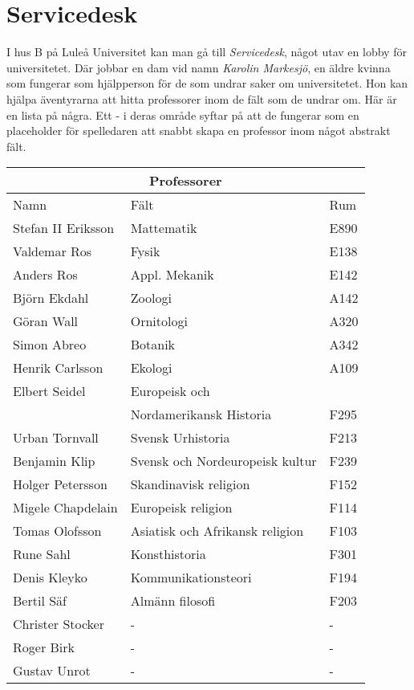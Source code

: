 \section{Servicedesk}
\label{loc:Servicedesk}
I hus B på Luleå Universitet kan man gå till \textit{Servicedesk}, något utav en lobby för universitetet. Där jobbar en dam vid namn \textit{Karolin Markesjö}, en äldre kvinna som fungerar som hjälpperson för de som undrar saker om universitetet. Hon kan hjälpa äventyrarna att hitta professorer inom de fält som de undrar om. Här är en lista på några. Ett - i deras område syftar på att de fungerar som en placeholder för spelledaren att snabbt skapa en professor inom något abstrakt fält.

\begin{center}
	\label{tab:Professorer}
	\begin{tabular}{ | l | l | l |  }
		\hline
		\multicolumn{3}{|c|}{Professorer} \\
		\hline
		Namn & Fält & Rum \\ 
		\hline
		Stefan II Eriksson & Mattematik & E890 \\
		Valdemar Ros & Fysik & E138 \\
		Anders Ros & Appl. Mekanik & E142 \\
		Björn Ekdahl & Zoologi & A142 \\
		Göran Wall & Ornitologi & A320 \\
		Simon Abreo & Botanik & A342 \\
		Henrik Carlsson & Ekologi & A109 \\
		Elbert Seidel & Europeisk och & \\ 
		 & Nordamerikansk Historia & F295 \\
		Urban Tornvall & Svensk Urhistoria & F213 \\
		Benjamin Klip & Svensk och Nordeuropeisk kultur & F239 \\
		Holger Petersson & Skandinavisk religion & F152 \\
		Migele Chapdelain & Europeisk religion & F114 \\
		Tomas Olofsson & Asiatisk och Afrikansk religion & F103 \\
		Rune Sahl & Konsthistoria & F301 \\
		Denis Kleyko & Kommunikationsteori & F194 \\
		Bertil Säf & Almänn filosofi & F203 \\
		Christer Stocker & - & - \\
		Roger Birk & - & - \\
		Gustav Unrot & - & - \\
		\hline
	\end{tabular}
\end{center}

